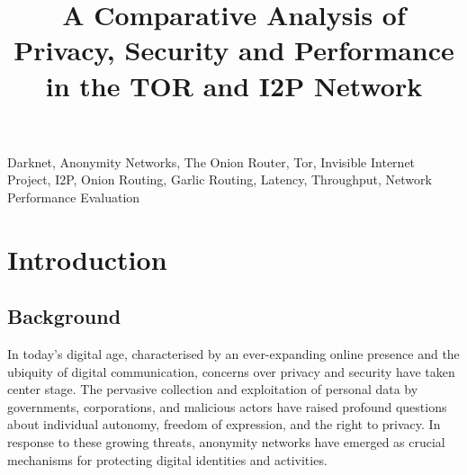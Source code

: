 \documentclass[12pt,conference]{IEEEtran}
\begin{document}
\title{A Comparative Analysis of Privacy, Security and Performance in the TOR and I2P Network}

\author{
\and
{}
\and
{}
}

\maketitle

\begin{abstract}
\blindtext %
\end{abstract}

\begin{IEEEkeywords}
Darknet, Anonymity Networks, The Onion Router, Tor, Invisible Internet Project, I2P, Onion Routing, Garlic Routing, Latency, Throughput, Network Performance Evaluation
\end{IEEEkeywords}

\section{Introduction}
\subsection{Background}
In today's digital age, characterised by an ever-expanding online presence and the ubiquity of digital communication, concerns over privacy and security have taken center stage. The pervasive collection and exploitation of personal data by governments, corporations, and malicious actors have raised profound questions about individual autonomy, freedom of expression, and the right to privacy. In response to these growing threats, anonymity networks have emerged as crucial mechanisms for protecting digital identities and activities\cite{aComparativeStudyOnAnonymizingNetworks}.
\end{document}
